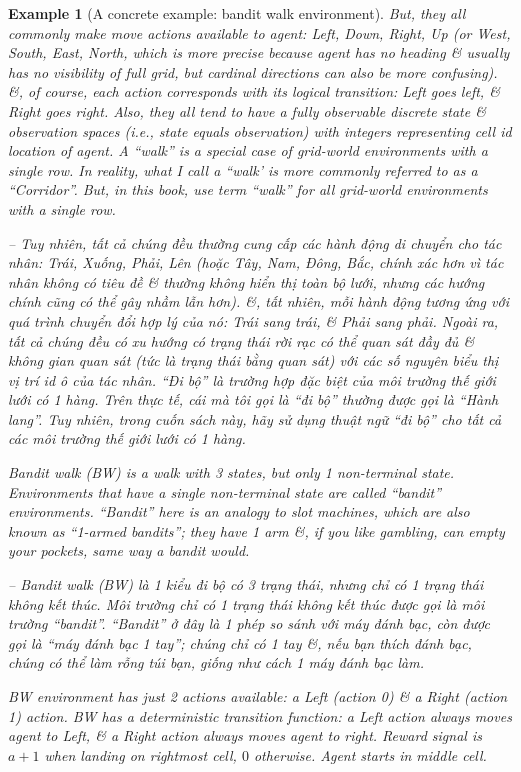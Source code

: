 \documentclass{article}
\newtheorem{example}{Example}
\begin{document}
\begin{itemize}
\begin{itemize}
\begin{itemize}
\begin{example}[A concrete example: bandit walk environment]
                But, they all commonly make move actions available to agent: Left, Down, Right, Up (or West, South, East, North, which is more precise because agent has no heading \& usually has no visibility of full grid, but cardinal directions can also be more confusing). \&, of course, each action corresponds with its logical transition: Left goes left, \& Right goes right. Also, they all tend to have a fully observable discrete state \& observation spaces (i.e., state equals observation) with integers representing cell id location of agent. A ``walk'' is a special case of grid-world environments with a single row. In reality, what I call a ``walk' is more commonly referred to as a ``Corridor''. But, in this book, use term ``walk'' for all grid-world environments with a single row.

                -- Tuy nhiên, tất cả chúng đều thường cung cấp các hành động di chuyển cho tác nhân: Trái, Xuống, Phải, Lên (hoặc Tây, Nam, Đông, Bắc, chính xác hơn vì tác nhân không có tiêu đề \& thường không hiển thị toàn bộ lưới, nhưng các hướng chính cũng có thể gây nhầm lẫn hơn). \&, tất nhiên, mỗi hành động tương ứng với quá trình chuyển đổi hợp lý của nó: Trái sang trái, \& Phải sang phải. Ngoài ra, tất cả chúng đều có xu hướng có trạng thái rời rạc có thể quan sát đầy đủ \& không gian quan sát (tức là trạng thái bằng quan sát) với các số nguyên biểu thị vị trí id ô của tác nhân. ``Đi bộ'' là trường hợp đặc biệt của môi trường thế giới lưới có 1 hàng. Trên thực tế, cái mà tôi gọi là ``đi bộ'' thường được gọi là ``Hành lang''. Tuy nhiên, trong cuốn sách này, hãy sử dụng thuật ngữ ``đi bộ'' cho tất cả các môi trường thế giới lưới có 1 hàng.

                Bandit walk (BW) is a walk with 3 states, but only 1 non-terminal state. Environments that have a single non-terminal state are called ``bandit'' environments. ``Bandit'' here is an analogy to slot machines, which are also known as ``1-armed bandits''; they have 1 arm \&, if you like gambling, can empty your pockets, same way a bandit would.

                -- Bandit walk (BW) là 1 kiểu đi bộ có 3 trạng thái, nhưng chỉ có 1 trạng thái không kết thúc. Môi trường chỉ có 1 trạng thái không kết thúc được gọi là môi trường ``bandit''. ``Bandit'' ở đây là 1 phép so sánh với máy đánh bạc, còn được gọi là ``máy đánh bạc 1 tay''; chúng chỉ có 1 tay \&, nếu bạn thích đánh bạc, chúng có thể làm rỗng túi bạn, giống như cách 1 máy đánh bạc làm.

                BW environment has just 2 actions available: a Left (action 0) \& a Right (action 1) action. BW has a deterministic transition function: a Left action always moves agent to Left, \& a Right action always moves agent to right. Reward signal is $a + 1$ when landing on rightmost cell, $0$ otherwise. Agent starts in middle cell.


\end{example}
\end{itemize}
\end{itemize}
\end{itemize}
\end{document}
